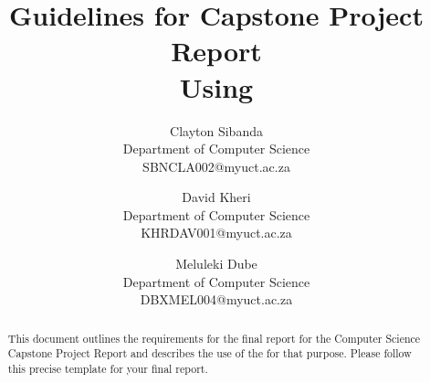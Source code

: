 \documentclass[11pt,a4paper]{article}
\begin{document}
\title{Guidelines for Capstone Project Report\\Using \LaTeXe} \date{}
\author{Clayton Sibanda\\Department of Computer Science\\SBNCLA002@myuct.ac.za
\and David Kheri\\Department of Computer Science\\KHRDAV001@myuct.ac.za
\and Meluleki Dube\\Department of Computer Science\\DBXMEL004@myuct.ac.za}

\chead{}
\lfoot{}
\cfoot{\thepage}    %
\rfoot{}
\renewcommand{\headrulewidth}{0.0pt}   %

\maketitle
\thispagestyle{plain}  %

\begin{abstract}
  This document outlines the requirements for the final report for the
  Computer Science Capstone Project Report and describes the use of
  the \LaTeXe for that purpose. Please follow this precise template
  for your final report.
\end{abstract}



















\end{document}
